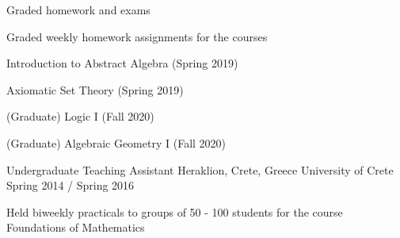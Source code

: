 \documentclass{academic-cv}
\begin{document}
\begin{cvlist}
{\begin{cvlist}
\begin{cvlist}
                        \item Graded homework and exams
                    \end{cvlist}
                    \vspace{0.2em}
                \item Graded weekly homework assignments for the courses
                    \begin{cvlist}
                        \item  Introduction to Abstract Algebra (Spring 2019)
                        \item  Axiomatic Set Theory (Spring 2019)
                        \item (Graduate) Logic I (Fall 2020)
                        \item (Graduate) Algebraic Geometry I (Fall 2020)
                    \end{cvlist}
            \end{cvlist}}
        \cvheading
            {Undergraduate Teaching Assistant}
            {Heraklion, Crete, Greece}
            {University of Crete}
            {Spring 2014 / Spring 2016}
            {\begin{cvlist}
                \item Held biweekly practicals to groups of 50 - 100 students for the course Foundations of Mathematics
            \end{cvlist}}
    \end{cvlist}
\end{document}
